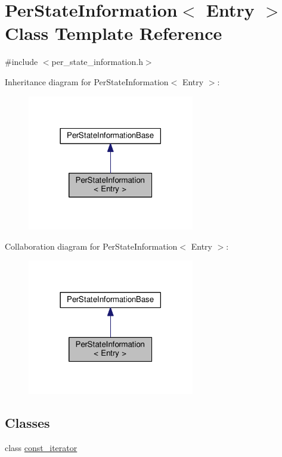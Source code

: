 \hypertarget{classPerStateInformation}{\section{Per\-State\-Information$<$ Entry $>$ Class Template Reference}
\label{classPerStateInformation}
}


{\ttfamily \#include $<$per\-\_\-state\-\_\-information.\-h$>$}



Inheritance diagram for Per\-State\-Information$<$ Entry $>$\-:
\nopagebreak
\begin{figure}[H]
\begin{center}
\leavevmode
\includegraphics[width=206pt]{classPerStateInformation__inherit__graph}
\end{center}
\end{figure}


Collaboration diagram for Per\-State\-Information$<$ Entry $>$\-:
\nopagebreak
\begin{figure}[H]
\begin{center}
\leavevmode
\includegraphics[width=206pt]{classPerStateInformation__coll__graph}
\end{center}
\end{figure}
\subsection*{Classes}
\begin{DoxyCompactItemize}
\item 
class \hyperlink{classPerStateInformation_1_1const__iterator}{const\-\_\-iterator}
\end{DoxyCompactItemize}
